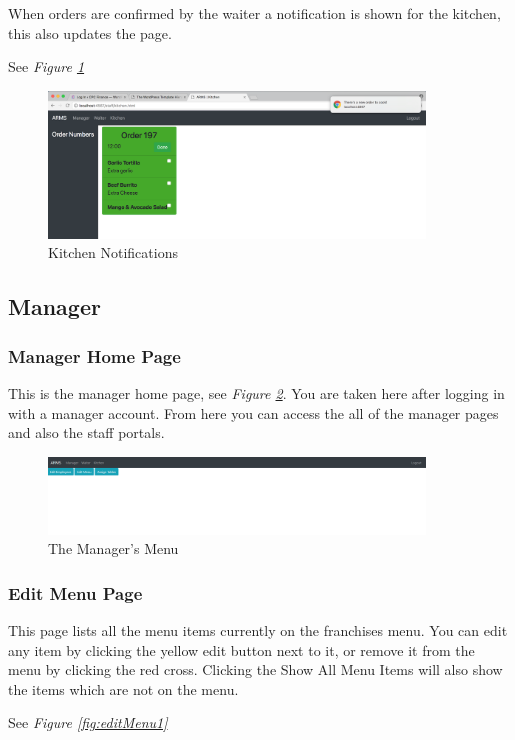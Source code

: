 \documentclass[12pt, twoside, a4paper]{report}
\begin{document}
When orders are confirmed by the waiter a notification is shown for the kitchen, this also updates the page.

See \textit{Figure \ref{fig:kitchen2}}

\begin{figure}[H]
  \centering
  \includegraphics[width=10cm]{Kitchen2.png}
  \caption{Kitchen Notifications}
  \label{fig:kitchen2}
\end{figure}

\subsection*{Manager}
\subsubsection*{Manager Home Page}
This is the manager home page, see \textit{Figure \ref{fig:manMenu}}. You are taken here after logging in with a manager account. From here you can access the all of the manager pages and also the staff portals.

\begin{figure}[H]
  \centering
  \includegraphics[width=10cm]{ManagerMenu.png}
  \caption{The Manager's Menu}
  \label{fig:manMenu}
\end{figure}

\subsubsection*{Edit Menu Page}
This page lists all the menu items currently on the franchises menu.
You can edit any item by clicking the yellow edit button next to it, or remove it from the menu by clicking the red cross.
Clicking the Show All Menu Items will also show the items which are not on the menu.

See \textit{Figure \ref{fig:editMenu1}}
\end{document}
